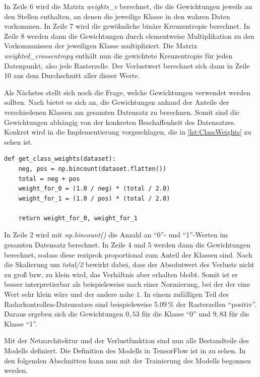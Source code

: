 In Zeile 6 wird die Matrix \emph{weights\_v} berechnet, die die Gewichtungen jeweils an den Stellen enthalten, an denen die jeweilige Klasse in den wahren Daten vorkommen.
In Zeile 7 wird die gewöhnliche binäre Kreuzentropie berechnet.
In Zeile 8 werden dann die Gewichtungen durch elementweise Multiplikation zu den Vorkommnissen der jeweiligen Klasse multipliziert.
Die Matrix \emph{weighted\_crossentropy} enthält nun die gewichtete Kreuzentropie für jeden Datenpunkt, also jede Rasterzelle.
Der Verlustwert berechnet sich dann in Zeile 10 aus dem Durchschnitt aller dieser Werte.

Als Nächstes stellt sich noch die Frage, welche Gewichtungen verwendet werden sollten.
Nach \cite{ImbalancedData} bietet es sich an, die Gewichtungen anhand der Anteile der verschiedenen Klassen am gesamten Datensatz zu berechnen.
Somit sind die Gewichtungen abhängig von der konkreten Beschaffenheit des Datensatzes.
Konkret wird in \cite{ImbalancedData} die Implementierung vorgeschlagen, die in \autoref{lst:ClassWeights} zu sehen ist.

\begin{minipage}{\textwidth}
\begin{code}
\begin{verbatim}
def get_class_weights(dataset):
    neg, pos = np.bincount(dataset.flatten())
    total = neg + pos
    weight_for_0 = (1.0 / neg) * (total / 2.0)
    weight_for_1 = (1.0 / pos) * (total / 2.0)

    return weight_for_0, weight_for_1
\end{verbatim}
\label{lst:ClassWeights}
\end{code}
\end{minipage}

In Zeile 2 wird mit \emph{np.bincount()} die Anzahl an "`0"'- und "`1"'-Werten im gesamten Datensatz berechnet.
In Zeile 4 und 5 werden dann die Gewichtungen berechnet, sodass diese reziprok proportional zum Anteil der Klassen sind.
Nach die Skalierung um \emph{total/2} bewirkt dabei, dass der Absolutwert des Verlusts nicht zu groß bzw. zu klein wird, das Verhältnis aber erhalten bleibt.
Somit ist er besser interpretierbar als beispielsweise nach einer Normierung, bei der der eine Wert sehr klein wäre und der andere nahe $1$.
In einem zufälligen Teil des Radarkontrollen-Datensatzes sind beispielsweise 5.09\,\% der Rasterzellen "`positiv"'.
Daraus ergeben sich die Gewichtungen $0,53$ für die Klasse "`0"' und $9,83$ für die Klasse "`1"'.

Mit der Netzarchitektur und der Verlustfunktion sind nun alle Bestandteile des Modells definiert.
Die Definition des Modells in TensorFlow ist in  zu sehen.
In den folgenden Abschnitten kann nun mit der Trainierung des Modells begonnen werden.
